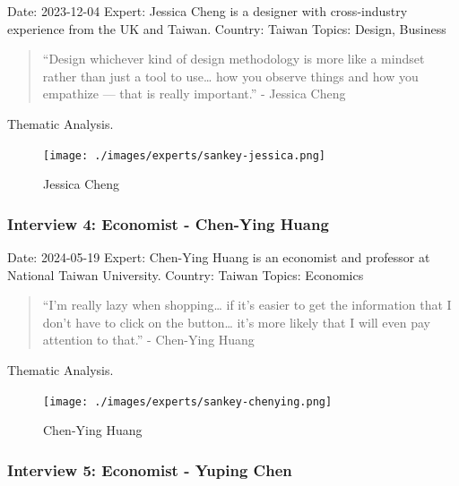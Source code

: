 \documentclass[
  12pt,
  letterpaper,
  DIV=11,
  numbers=noendperiod]{scrartcl}
\begin{document}
Date: 2023-12-04 Expert: Jessica Cheng is a designer with cross-industry
experience from the UK and Taiwan. Country: Taiwan Topics: Design,
Business

\begin{quote}
``Design whichever kind of design methodology is more like a mindset
rather than just a tool to use\ldots{} how you observe things and how
you empathize --- that is really important.'' - Jessica Cheng
\end{quote}

Thematic Analysis.

\begin{figure}[H]

{\centering \texttt{[image: ./images/experts/sankey-jessica.png]}

}

\caption{Jessica Cheng}

\end{figure}%

\subsubsection{Interview 4: Economist - Chen-Ying
Huang}\label{interview-4-economist---chen-ying-huang}

Date: 2024-05-19 Expert: Chen-Ying Huang is an economist and professor
at National Taiwan University. Country: Taiwan Topics: Economics

\begin{quote}
``I'm really lazy when shopping\ldots{} if it's easier to get the
information that I don't have to click on the button\ldots{} it's more
likely that I will even pay attention to that.'' - Chen-Ying Huang
\end{quote}

Thematic Analysis.

\begin{figure}[H]

{\centering \texttt{[image: ./images/experts/sankey-chenying.png]}

}

\caption{Chen-Ying Huang}

\end{figure}%

\subsubsection{Interview 5: Economist - Yuping
Chen}\label{interview-5-economist---yuping-chen}
\end{document}
